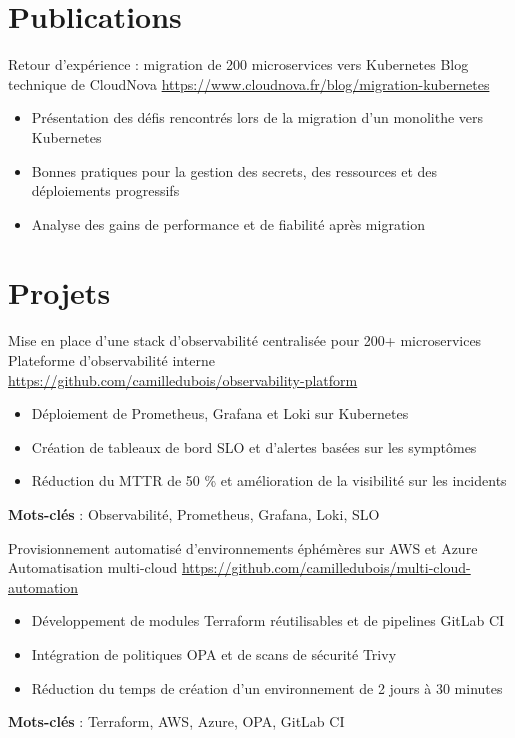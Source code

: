 \documentclass[a4paper, serif, 10pt]{moderncv}
\begin{document}
\section{Publications}

        {Retour d'expérience : migration de 200 microservices vers Kubernetes}
        {Blog technique de CloudNova}
        {\url{https://www.cloudnova.fr/blog/migration-kubernetes}}
        {}
        {\begin{itemize}
\item Présentation des défis rencontrés lors de la migration d'un monolithe vers Kubernetes
\item Bonnes pratiques pour la gestion des secrets, des ressources et des déploiements progressifs
\item Analyse des gains de performance et de fiabilité après migration
\end{itemize}}
\section{Projets}

        {Mise en place d'une stack d'observabilité centralisée pour 200+ microservices}
        {Plateforme d'observabilité interne}
        {\url{https://github.com/camilledubois/observability-platform}}
        {}
        {\begin{itemize}
\item Déploiement de Prometheus, Grafana et Loki sur Kubernetes
\item Création de tableaux de bord SLO et d'alertes basées sur les symptômes
\item Réduction du MTTR de 50 \% et amélioration de la visibilité sur les incidents
\end{itemize}
\textbf{Mots-clés} : Observabilité, Prometheus, Grafana, Loki, SLO}

        {Provisionnement automatisé d'environnements éphémères sur AWS et Azure}
        {Automatisation multi-cloud}
        {\url{https://github.com/camilledubois/multi-cloud-automation}}
        {}
        {\begin{itemize}
\item Développement de modules Terraform réutilisables et de pipelines GitLab CI
\item Intégration de politiques OPA et de scans de sécurité Trivy
\item Réduction du temps de création d'un environnement de 2 jours à 30 minutes
\end{itemize}
\textbf{Mots-clés} : Terraform, AWS, Azure, OPA, GitLab CI}
\end{document}
